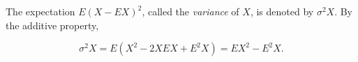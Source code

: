 The expectation $E(X - EX)^2$, called the \textit{variance} of $X$, is denoted by $\sigma^2 X$. By the additive property,

$$\sigma^2 X = E(X^2 - 2XEX + E^2X) = EX^2 - E^2X.$$
